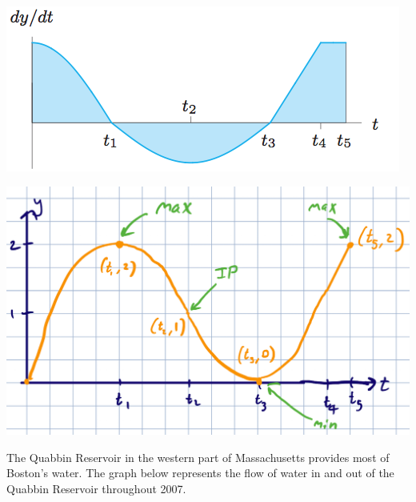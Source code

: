 \documentclass[11pt]{exam}
\begin{document}
\begin{questions}
  \begin{center}
    \includegraphics[scale=0.5]{no17}
  \end{center}
  \begin{solution}
    \begin{center}
      \includegraphics[scale=0.5]{5}
    \end{center}
  \end{solution}
\question The Quabbin Reservoir in the western part of Massachusetts
  provides most of Boston's water. The graph below represents the flow
  of water in and out of the Quabbin Reservoir throughout 2007.
\end{questions}
\end{document}
